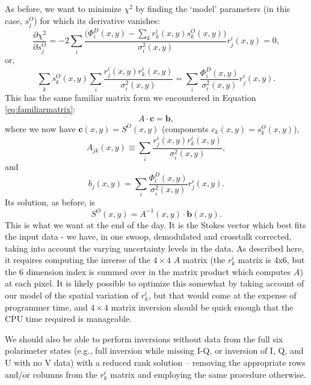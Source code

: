 \documentclass[11pt]{article}
\begin{document}
As before, we want to minimize $\chi^2$ by finding the `model' parameters (in this case, $s^O_j$) for which its derivative vanishes:
\begin{equation}
	\frac{\partial\chi^2}{\partial s^O_j} = -2\sum_{i} \frac{\big(\Phi^D_i(x,y)-\sum_k r^i_k(x,y) s^O_k(x,y)\big)}{\sigma^2_i(x,y)} r^i_j(x,y) = 0,
\end{equation}
or,
\begin{equation}
	\sum_k s^O_k(x,y)\sum_i\frac{r^i_j(x,y) r^i_k(x,y)}{\sigma^2_i(x,y)}  = \sum_i\frac{\Phi^D_i(x,y)}{\sigma^2_i(x,y)} r^i_j(x,y).
\end{equation}
This has the same familiar matrix form we encountered in Equation \ref{eq:familiarmatrix}:
\begin{equation}
	A\cdot \mathbf{c} = \mathbf{b},
\end{equation}
where we now have $\mathbf{c}(x,y) = S^O(x,y)$ (components $c_k(x,y) = s^O_k(x,y)$), 
\begin{equation}
	A_{jk}(x,y) \equiv \sum_i\frac{r^i_j(x,y) r^i_k(x,y)}{\sigma^2_i(x,y)},
\end{equation}
and
\begin{equation}
	b_j(x,y) = \sum_i\frac{\Phi^D_i(x,y)}{\sigma^2_i(x,y)} r^i_j(x,y).
\end{equation}
Its solution, as before, is
\begin{equation}
	S^O(x,y) = A^{-1}(x,y)\cdot\mathbf{b}(x,y).
\end{equation}
This is what we want at the end of the day. It is the Stokes vector which best fits the input data - we have, in one swoop, demodulated and crosstalk corrected, taking into account the varying uncertainty levels in the data. As described here, it requires computing the inverse of the $4\times 4$ $A$ matrix (the $r^i_k$ matrix is 4x6, but the 6 dimension index is summed over in the matrix product which computes $A$) at each pixel. It is likely possible to optimize this somewhat by taking account of our model of the spatial variation of $r^i_k$, but that would come at the expense of programmer time, and $4\times 4$ matrix inversion should be quick enough that the CPU time required is manageable.

We should also be able to perform inversions without data from the full six polarimeter states (e.g., full inversion while missing I-Q, or inversion of I, Q, and U with no V data) with a reduced rank solution -- removing the appropriate rows and/or columns from the $r^i_k$ matrix and employing the same procedure otherwise.
\end{document}
